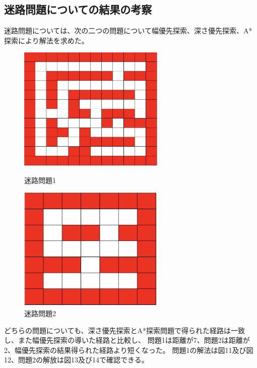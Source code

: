 \documentclass[uplatex]{jsarticle}
\begin{document}
\subsection{迷路問題についての結果の考察}
迷路問題については、次の二つの問題について幅優先探索、深さ優先探索、A*探索により解法を求めた。
\begin{figure}[htbp]
 \begin{minipage}{0.5\hsize}
  \begin{center}
   \includegraphics[width=70mm]{img/maze_1.png}
  \end{center}
  \caption{迷路問題1}
  \label{fig:one}
 \end{minipage}
 \begin{minipage}{0.5\hsize}
  \begin{center}
   \includegraphics[width=70mm]{img/maze_2.png}
  \end{center}
  \caption{迷路問題2}
  \label{fig:two}
 \end{minipage}
\end{figure}
どちらの問題についても、深さ優先探索とA*探索問題で得られた経路は一致し、また幅優先探索の導いた経路と比較し、
問題1は距離が7、問題2は距離が2、幅優先探索の結果得られた経路より短くなった。
問題1の解法は図11及び図12、問題2の解放は図13及び14で確認できる。
\end{document}

